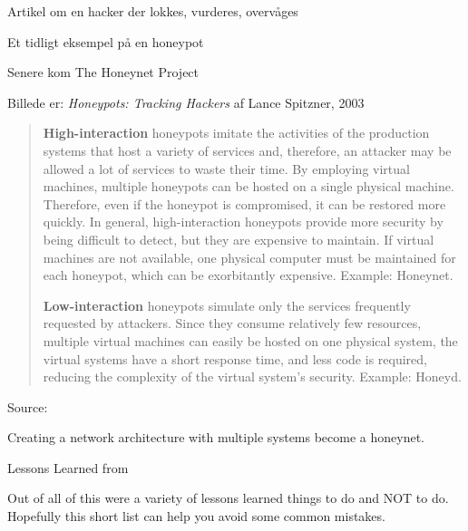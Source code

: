 \documentclass[Screen16to9,17pt]{foils}
\begin{document}
\begin{list1}
\item Artikel om en hacker der lokkes, vurderes, overvåges
\item Et tidligt eksempel på en honeypot
\item Senere kom The Honeynet Project 
\item Billede er: \emph{Honeypots: Tracking Hackers}
af Lance Spitzner, 2003
\end{list1}



\begin{quote}
{\bf High-interaction} honeypots imitate the activities of the production systems that host a variety of services and, therefore, an attacker may be allowed a lot of services to waste their time. By employing virtual machines, multiple honeypots can be hosted on a single physical machine. Therefore, even if the honeypot is compromised, it can be restored more quickly. In general, high-interaction honeypots provide more security by being difficult to detect, but they are expensive to maintain. If virtual machines are not available, one physical computer must be maintained for each honeypot, which can be exorbitantly expensive. Example: Honeynet.

{\bf Low-interaction} honeypots simulate only the services frequently requested by attackers. Since they consume relatively few resources, multiple virtual machines can easily be hosted on one physical system, the virtual systems have a short response time, and less code is required, reducing the complexity of the virtual system's security. Example: Honeyd.
\end{quote}

Source:



Creating a network architecture with multiple systems become a honeynet.

\begin{list2}
\item Lessons Learned from 
\item Out of all of this were a variety of lessons learned things to do and NOT to do. Hopefully this short list can help you avoid some common mistakes.
\end{list2}
\end{document}

